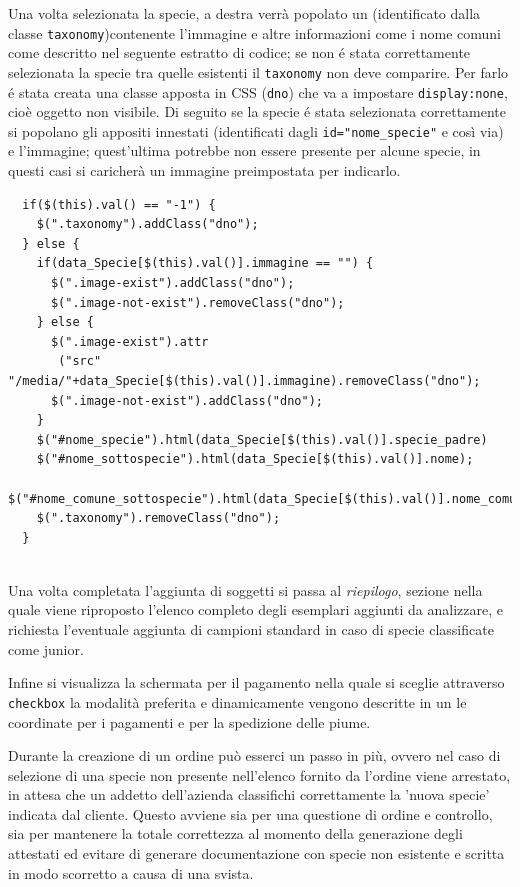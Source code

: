 Una volta selezionata la specie, a destra verrà popolato un  (identificato dalla classe \texttt{taxonomy})contenente l'immagine e altre informazioni come i nome comuni come descritto nel seguente estratto di codice; se non é stata correttamente selezionata la specie tra quelle esistenti  il  \texttt{taxonomy} non deve comparire. Per farlo é stata creata una classe apposta in CSS (\texttt{dno}) che va a impostare \texttt{display:none}, cioè oggetto non visibile. Di seguito se la specie é stata selezionata correttamente si popolano gli appositi  innestati (identificati dagli \texttt{id="nome\_specie"} e così via) e l'immagine; quest'ultima potrebbe non essere presente per alcune specie, in questi casi si caricherà un immagine preimpostata per indicarlo.

\begin{footnotesize}
\begin{verbatim}
  if($(this).val() == "-1") {
    $(".taxonomy").addClass("dno");
  } else {
    if(data_Specie[$(this).val()].immagine == "") {
      $(".image-exist").addClass("dno");
      $(".image-not-exist").removeClass("dno");
    } else {
      $(".image-exist").attr
       ("src" "/media/"+data_Specie[$(this).val()].immagine).removeClass("dno");
      $(".image-not-exist").addClass("dno");
    }
    $("#nome_specie").html(data_Specie[$(this).val()].specie_padre)
    $("#nome_sottospecie").html(data_Specie[$(this).val()].nome);
    $("#nome_comune_sottospecie").html(data_Specie[$(this).val()].nome_comune);
    $(".taxonomy").removeClass("dno");
  } 
 
\end{verbatim}
\end{footnotesize}

Una volta completata l'aggiunta di soggetti si passa al \emph{riepilogo}, sezione nella quale viene riproposto l'elenco completo degli esemplari aggiunti da analizzare, e richiesta l'eventuale aggiunta di campioni standard in caso di specie classificate come junior.

Infine si visualizza la schermata per il pagamento nella quale si sceglie attraverso \texttt{checkbox} la modalità preferita e dinamicamente vengono descritte in un  le coordinate per i pagamenti e per la spedizione delle piume.

Durante la creazione di un ordine può esserci un passo in più, ovvero nel caso di selezione di una specie non presente nell'elenco fornito da {\fem} l'ordine viene arrestato, in attesa che un addetto dell'azienda classifichi correttamente la 'nuova specie' indicata dal cliente. Questo avviene sia per una questione di ordine e controllo, sia per mantenere la totale correttezza al momento della generazione degli attestati ed evitare di generare documentazione con specie non esistente e scritta in modo scorretto a causa di una svista.

